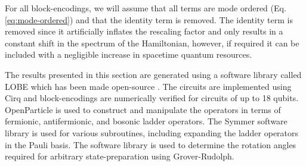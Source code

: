 For all block-encodings, we will assume that all terms are mode ordered (Eq. \ref{eq:mode-ordered}) and that the identity term is removed.
The identity term is removed since it artificially inflates the rescaling factor and only results in a constant shift in the spectrum of the Hamiltonian, however, if required it can be included with a negligible increase in spacetime quantum resources.

The results presented in this section are generated using a software library called LOBE which has been made open-source \cite{}.
The circuits are implemented using Cirq \cite{cirq} and block-encodings are numerically verified for circuits of up to 18 qubits.
OpenParticle \cite{openparticle} is used to construct and manipulate the operators in terms of fermionic, antifermionic, and bosonic ladder operators.
The Symmer software library \cite{} is used for various subroutines, including expanding the ladder operators in the Pauli basis.
The software library \cite{grover-rudolph-github} is used to determine the rotation angles required for arbitrary state-preparation using Grover-Rudolph.







